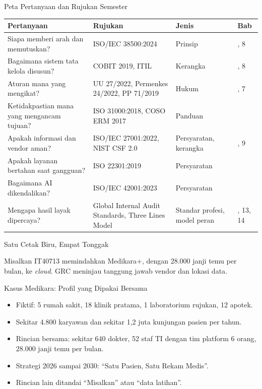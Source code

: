 \documentclass[aspectratio=169, table, 12pt]{beamer}
\begin{document}
\begin{frame}{{\Large Peta Pertanyaan dan Rujukan Semester}}
  \scriptsize
  \begin{tabularx}{\textwidth}{|>{\raggedright\arraybackslash}p{}|>{\raggedright\arraybackslash}X|>{\raggedright\arraybackslash}p{}|>{\raggedright\arraybackslash}p{}|}
    \hline
    \textbf{Pertanyaan} & \textbf{Rujukan} & \textbf{Jenis} & \textbf{Bab} \\ \hline
    Siapa memberi arah dan memutuskan? & ISO/IEC 38500:2024 & Prinsip & 2, 8 \\ \hline
    Bagaimana sistem tata kelola disusun? & COBIT 2019, ITIL & Kerangka & 4, 8 \\ \hline
    Aturan mana yang mengikat? & UU 27/2022, Permenkes 24/2022, PP 71/2019 & Hukum & 3, 7 \\ \hline
    Ketidakpastian mana yang mengancam tujuan? & ISO 31000:2018, COSO ERM 2017 & Panduan & 5 \\ \hline
    Apakah informasi dan vendor aman? & ISO/IEC 27001:2022, NIST CSF 2.0 & Persyaratan, kerangka & 6, 9 \\ \hline
    Apakah layanan bertahan saat gangguan? & ISO 22301:2019 & Persyaratan & 10 \\ \hline
    Bagaimana AI dikendalikan? & ISO/IEC 42001:2023 & Persyaratan & 11 \\ \hline
    Mengapa hasil layak dipercaya? & Global Internal Audit Standards, Three Lines Model & Standar
    profesi, model peran & 12, 13, 14 \\ \hline
  \end{tabularx}
\end{frame}

\begin{frame}{{\Large Satu Cetak Biru, Empat Tonggak}}
  \centering
  \resizebox{!}{0.6\textheight}{}

  \vspace{2pt}
  \raggedright\footnotesize Misalkan IT40713 memindahkan Medikara+, dengan 28.000 janji temu per
  bulan, ke \textit{cloud}. GRC meninjau tanggung jawab vendor dan lokasi data.
\end{frame}

\begin{frame}{{\Large Kasus Medikara: Profil yang Dipakai Bersama}}
  \vspace{4pt}
  \small
  \begin{itemize}
    \item Fiktif: 5 rumah sakit, 18 klinik pratama, 1 laboratorium rujukan, 12 apotek.
    \item Sekitar 4.800 karyawan dan sekitar 1,2 juta kunjungan pasien per tahun.
    \item Rincian bersama: sekitar 640 dokter, 52 staf TI dengan tim platform 6 orang, 28.000 janji
          temu per bulan.
    \item Strategi 2026 sampai 2030: ``Satu Pasien, Satu Rekam Medis''.
    \item Rincian lain ditandai ``Misalkan'' atau ``data latihan''.
  \end{itemize}
\end{frame}
\end{document}
